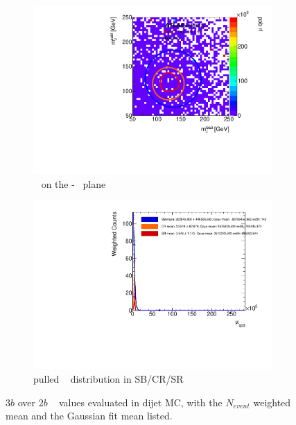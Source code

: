 \begin{figure}[htb!]
\centering
\captionsetup{justification=centering}
	\hspace{-1cm}
    \begin{subfigure}[b]{0.4\textwidth}
        \includegraphics[width=\textwidth,angle=-90]{figures/boosted/AppendixMuqcdstudy/QCD_ThreeTag_Incl_mH0H1.pdf}
        \caption{\muqcd~ on the \mleadJ-\msublJ~ plane}
        \label{fig:app-muqcd-3b-2d-qcd}
    \end{subfigure}
    \quad \quad \quad \quad 
    \begin{subfigure}[b]{0.4\textwidth}
        \includegraphics[width=\textwidth,angle=-90]{figures/boosted/AppendixMuqcdstudy/QCD_ThreeTag_Incl_mH0H1_pull.pdf}
        \caption{pulled \muqcd~ distribution in SB/CR/SR}
        \label{fig:app-muqcd-3b-pull-qcd}
    \end{subfigure}
\caption{$3b$ over $2b$ \muqcd~ values evaluated in dijet MC, with the $N_{event}$ weighted mean and the Gaussian fit mean listed.}
\label{fig:app-muqcd-3b-qcd}
\end{figure}

